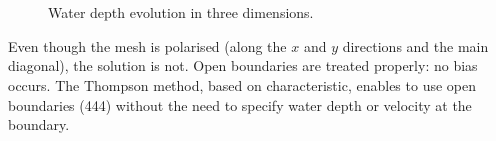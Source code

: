 \begin{figure}[!htbp]
\begin{minipage}[t]{0.50\textwidth}
 \centering
\end{minipage}
\begin{minipage}[t]{0.50\textwidth}
 \centering
\end{minipage}\\
\begin{minipage}[t]{0.50\textwidth}
 \centering
\end{minipage}
\begin{minipage}[t]{0.50\textwidth}
 \centering
\end{minipage}\\
\begin{minipage}[t]{0.50\textwidth}
 \centering
\end{minipage}
\begin{minipage}[t]{0.50\textwidth}
 \centering
\end{minipage}
 \caption{Water depth evolution in three dimensions.}
 \label{t3d:thomson:fig:depth_evol3D}
\end{figure}


\bigskip
Even though the mesh is polarised (along the $x$ and $y$ directions and
the main diagonal), the solution is not.
Open boundaries are treated properly: no bias occurs.
The Thompson method, based on characteristic,
enables to use open boundaries (444) without the need to specify water
depth or velocity at the boundary.

